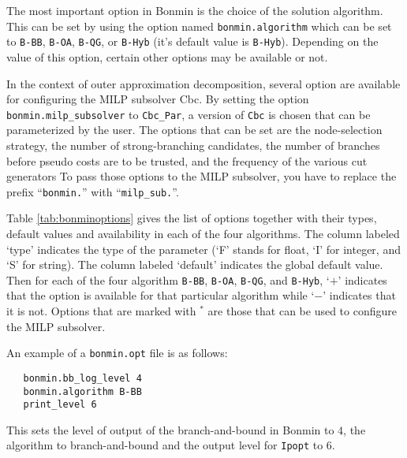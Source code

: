 The most important option in Bonmin is the choice of the solution algorithm.
This can be set by using the option named \texttt{bonmin.algorithm} which can be set to \texttt{B-BB}, \texttt{B-OA}, \texttt{B-QG}, or \texttt{B-Hyb} (it's default value is \texttt{B-Hyb}).
Depending on the value of this option, certain other options may be available or not.

In the context of outer approximation decomposition, several option are available for configuring the MILP subsolver Cbc.
By setting the option \texttt{bonmin.milp\_subsolver} to \texttt{Cbc\_Par}, a version of \texttt{Cbc} is chosen that can be parameterized by the user.
The options that can be set are the node-selection strategy, the number of strong-branching candidates,
the number of branches before pseudo costs are to be trusted, and the frequency of the various cut generators
To pass those options to the MILP subsolver, you have to replace the prefix ``\texttt{bonmin.}'' with ``\texttt{milp\_sub.}''.

Table \ref{tab:bonminoptions} gives the list of options together with their types, default values and availability in each of the four algorithms.
The column labeled `type' indicates the type of the parameter (`F' stands for float, `I' for integer, and `S' for
string).
The column labeled `default' indicates the global default value.
Then for each of the four algorithm \texttt{B-BB}, \texttt{B-OA}, \texttt{B-QG}, and \texttt{B-Hyb}, `$+$' indicates that the option is available for that particular algorithm while `$-$' indicates that it is not.
Options that are marked with $^*$ are those that can be used to configure the MILP subsolver.

An example of a \texttt{bonmin.opt} file is as follows:
\begin{verbatim}
   bonmin.bb_log_level 4
   bonmin.algorithm B-BB
   print_level 6
\end{verbatim}
This sets the level of output of the branch-and-bound in Bonmin to $4$, the algorithm to branch-and-bound
and the output level for \texttt{Ipopt} to $6$.

